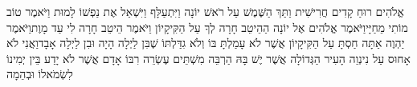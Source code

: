 \documentclass[../main/main.tex]{subfiles}
\begin{document}
\begin{multicols}{\ncols}
אֱלֹהִים רוּחַ קָדִים חֲרִישִׁית וַתַּךְ הַשֶּׁמֶשׁ עַל רֹאשׁ יוֹנָה וַיִּתְעַלָּף וַיִּשְׁאַל אֶת נַפְשׁוֹ לָמוּת וַיֹּאמֶר טוֹב מוֹתִי מֵחַיָּי\PreVerseSpace{}וַיֹּאמֶר אֱלֹהִים אֶל יוֹנָה הַהֵיטֵב חָרָה לְךָ עַל הַקִּיקָיוֹן וַיֹּאמֶר הֵיטֵב חָרָה לִי עַד מָוֶת\PreVerseSpace{}וַיֹּאמֶר יַהְוֶה אַתָּה חַסְתָּ עַל הַקִּיקָיוֹן אֲשֶׁר לֹא עָמַלְתָּ בּוֹ וְלֹא גִדַּלְתּוֹ שֶׁבִּן לַיְלָה הָיָה וּבִן לַיְלָה אָבָד\PreVerseSpace{}וַאֲנִי לֹא אָחוּס עַל נִינְוֵה הָעִיר הַגְּדוֹלָה אֲשֶׁר יֶשׁ בָּהּ הַרְבֵּה מִשְׁתֵּים עֶשְׂרֵה רִבּוֹ אָדָם אֲשֶׁר לֹא יָדַע בֵּין יְמִינוֹ לִשְׂמֹאלוֹ וּבְהֵמָה\par
\pagebreak
\end{multicols}
\end{document}
